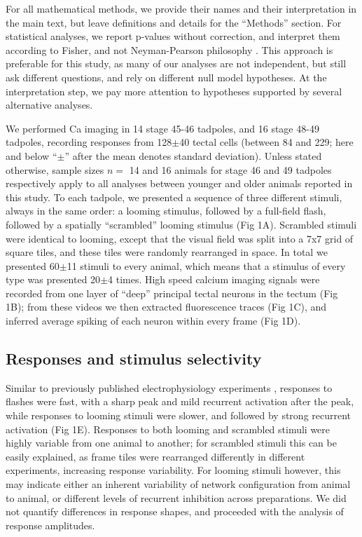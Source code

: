 \documentclass{article}
\begin{document}
For all mathematical methods, we provide their names and their interpretation in the main text, but leave definitions and details for the “Methods” section. For statistical analyses, we report p-values without correction, and interpret them according to Fisher, and not Neyman-Pearson philosophy \citep{greenland2016}. This approach is preferable for this study, as many of our analyses are not independent, but still ask different questions, and rely on different null model hypotheses. At the interpretation step, we pay more attention to hypotheses supported by several alternative analyses.

We performed Ca imaging in 14 stage 45-46 tadpoles, and 16 stage 48-49 tadpoles, recording responses from 128$\pm$40 tectal cells (between 84 and 229; here and below “$\pm$” after the mean denotes standard deviation). Unless stated otherwise, sample sizes $n=$ 14 and 16 animals for stage 46 and 49 tadpoles respectively apply to all analyses between younger and older animals reported in this study. To each tadpole, we presented a sequence of three different stimuli, always in the same order: a looming stimulus, followed by a full-field flash, followed by a spatially “scrambled” looming stimulus (Fig 1A). Scrambled stimuli were identical to looming, except that the visual field was split into a 7x7 grid of square tiles, and these tiles were randomly rearranged in space. In total we presented 60$\pm$11 stimuli to every animal, which means that a stimulus of every type was presented 20$\pm$4 times. High speed calcium imaging signals \citep{xu2011,truszkowski2017} were recorded from one layer of “deep” principal tectal neurons in the tectum (Fig 1B); from these videos we then extracted fluorescence traces (Fig 1C), and inferred average spiking of each neuron within every frame (Fig 1D).

\subsection*{Responses and stimulus selectivity}

Similar to previously published electrophysiology experiments \citep{khakhalin2014}, responses to flashes were fast, with a sharp peak and mild recurrent activation after the peak, while responses to looming stimuli were slower, and followed by strong recurrent activation (Fig 1E). Responses to both looming and scrambled stimuli were highly variable from one animal to another; for scrambled stimuli this can be easily explained, as frame tiles were rearranged differently in different experiments, increasing response variability. For looming stimuli however, this may indicate either an inherent variability of network configuration from animal to animal, or different levels of recurrent inhibition across preparations. We did not quantify differences in response shapes, and proceeded with the analysis of response amplitudes.
\end{document}
